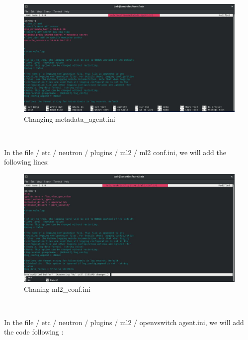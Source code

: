 \begin{spacing}{1.2}
\\
\begin{figure}[!htb] 
\begin{center} 
\includegraphics[width=1\linewidth]{Cloud/Installing and Configuring Neutron services/Changing metadata_agent.ini} 
\end{center} 
\caption{Changing metadata_agent.ini} 
\end{figure} 
\FloatBarrier
\\
\par In the file / etc / neutron / plugins / ml2 / ml2 conf.ini, we will add the following lines:
\\
\begin{figure}[!htb] 
\begin{center} 
\includegraphics[width=1\linewidth]{Cloud/Installing and Configuring Neutron services/Chaning ml2_conf.ini} 
\end{center} 
\caption{Chaning ml2_conf.ini} 
\end{figure} 
\FloatBarrier
\\
\par In the file / etc / neutron / plugins / ml2 / openvswitch agent.ini, we will add the code
following :
\\

\end{spacing}
